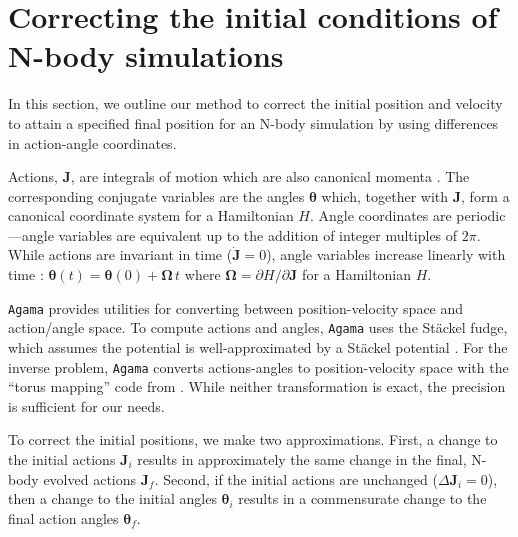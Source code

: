 \documentclass[times,trackchanges, twocolumn, twocolappendix]{aastex701}
\newcommand{\agama}{\texttt{Agama}}
\begin{document}
\appendix

\section{Correcting the initial conditions of N-body simulations}\label{sec:action_correction}

In this section, we outline our method to correct the initial position and velocity to attain a specified final position for an N-body simulation by using differences in action-angle coordinates.

Actions, $\mathbf{J}$, are integrals of motion which are also canonical momenta \citep[see, e.g.,][section 3.5]{BT2008}. The corresponding conjugate variables are the angles $\bm\theta$ which, together with $\mathbf J$, form a canonical coordinate system for a Hamiltonian $H$.
Angle coordinates are periodic---angle variables are equivalent up to the addition of integer multiples of $2\pi$.
While actions are invariant in time ($\dot{\mathbf J} = 0$), angle variables increase linearly with time : $\bm\theta(t) = \bm\theta(0) + \bm \Omega\,t$ where $\bm\Omega = \partial H / \partial \mathbf J$ for a Hamiltonian $H$. 

\agama{} provides utilities for converting between position-velocity space and action/angle space. To compute actions and angles, \agama{} uses the St\"ackel fudge, which assumes the potential is well-approximated by a St\"ackel potential \citep[see]{BT2008}. For the inverse problem, \agama{} converts actions-angles to position-velocity space with the ``torus mapping'' code from \citet{binney+mcmillan2016}. While neither transformation is exact, the precision is sufficient for our needs. 

To correct the initial positions, we make two approximations. First, a change to the initial actions $\mathbf J_i$ results in approximately the same change in the final, N-body evolved actions $\mathbf J_f$. Second, if the initial actions are unchanged ($\Delta \mathbf J_i = 0$),  then a change to the initial angles $\bm \theta_i$ results in a commensurate change to the final action angles $\bm \theta_f$. 
\end{document}
